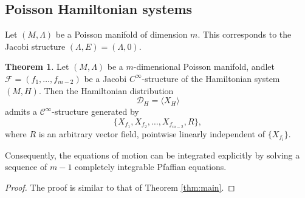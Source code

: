 \documentclass{article}
\theoremstyle{remark}
\theoremstyle{definition}
\newtheorem{theorem}{Theorem}[section]
\newcommand{\cinf}{$\mathcal{C}^{\infty}$}
\begin{document}
\subsection{Poisson Hamiltonian systems}

Let $(M,\Lambda)$ be a Poisson manifold of dimension $m$. This corresponds to the
Jacobi structure $(\Lambda,E)=(\Lambda,0)$.
\begin{theorem}\label{Pio}
Let $(M,\Lambda)$ be a $m$-dimensional Poisson manifold, and\linebreak[4] let
$\mathcal{F}=(f_1,\dots,f_{m-2})$ be a Jacobi $C^\infty$-structure of the Hamiltonian system $(M,H)$.
 Then the Hamiltonian distribution
\[
\mathcal{D}_H=\langle X_H\rangle
\]
admits a \cinf-structure generated by
\[
\{X_{f_1},X_{f_2},\dots,X_{f_{m-2}},R\},
\]
where $R$ is an arbitrary vector field, pointwise linearly independent of $\{X_{f_i}\}$.

Consequently, the equations of motion can be integrated explicitly by solving a
sequence of $m-1$ completely integrable Pfaffian equations.
\end{theorem}
\begin{proof}
  The proof is similar to that of Theorem \ref{thm:main}.
\end{proof}
\end{document}
